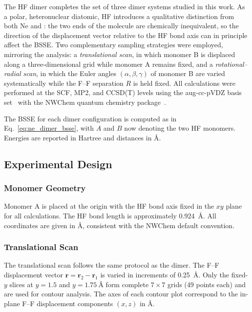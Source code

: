 The HF dimer completes the set of three dimer systems studied in this
work. As a polar, heteronuclear diatomic, HF introduces a qualitative
distinction from both Ne and : the two ends of the molecule
are chemically inequivalent, so the direction of the displacement
vector relative to the HF bond axis can in principle affect the BSSE.
Two complementary sampling strategies were employed, mirroring the
 analysis: a \textit{translational scan}, in which monomer B
is displaced along a three-dimensional grid while monomer A remains
fixed, and a \textit{rotational--radial scan}, in which the Euler
angles $(\alpha, \beta, \gamma)$ of monomer B are varied
systematically while the F--F separation $R$ is held fixed. All
calculations were performed at the SCF, MP2, and CCSD(T) levels using
the aug-cc-pVDZ basis set~\cite{dunning1989,kendall1992} with the
NWChem quantum chemistry package~\cite{nwchem2020}.

The BSSE for each dimer configuration is computed as in
Eq.~\eqref{eq:ne_dimer_bsse}, with $A$ and $B$ now denoting the two
HF monomers. Energies are reported in Hartree and distances in \AA.

\subsection{Experimental Design}

\subsubsection{Monomer Geometry}

Monomer A is placed at the origin with the HF bond axis fixed in the
$xy$ plane for all calculations. The HF bond length is approximately
\SI{0.924}{\angstrom}. All coordinates are given in \AA, consistent
with the NWChem default convention.

\subsubsection{Translational Scan}

The translational scan follows the same protocol as the 
dimer. The F--F displacement vector $\mathbf{r} = \mathbf{r}_2 -
\mathbf{r}_1$ is varied in increments of \SI{0.25}{\angstrom}. Only
the fixed-$y$ slices at $y = 1.5$ and $y = \SI{1.75}{\angstrom}$
form complete $7 \times 7$ grids (49 points each) and are used for
contour analysis. The axes of each contour plot correspond to the
in-plane F--F displacement components $(x, z)$ in \AA.

